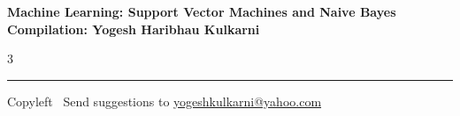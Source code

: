 \documentclass[8pt,landscape]{article}
\begin{document}
\footnotesize


\begin{center}
\Large{\textbf{Machine Learning: Support Vector Machines and Naive Bayes\\ Compilation: Yogesh Haribhau Kulkarni}}
\end{center}

\begin{multicols}{3}

\end{multicols}

\rule{\linewidth}{0.25pt}
\scriptsize
Copyleft \textcopyleft\  Send suggestions to
\href{http://www.yogeshkulkarni.com}{yogeshkulkarni@yahoo.com}
\end{document}
